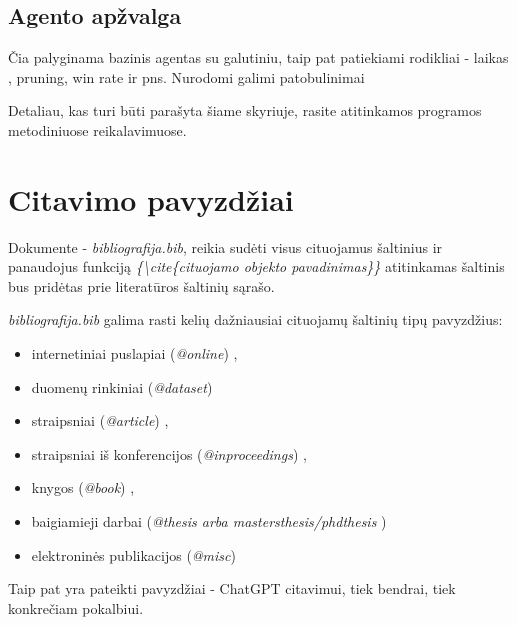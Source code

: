 \documentclass[]{VUMIFTemplateClass}
\begin{document}
\subsection{Agento apžvalga}
Čia palyginama bazinis agentas su galutiniu, taip pat patiekiami rodikliai - laikas , pruning, win rate ir pns. Nurodomi galimi patobulinimai




Detaliau, kas turi būti parašyta šiame skyriuje, rasite atitinkamos programos metodiniuose reikalavimuose. 

\printbibliography[title = {Literatūra ir šaltiniai}]


\appendix
\renewcommand{\thesection}{\arabic{section} priedas.}

\section{\phantom{Priedas} Citavimo pavyzdžiai}
Dokumente - \textit{bibliografija.bib}, reikia sudėti visus cituojamus šaltinius ir panaudojus funkciją \textit{\{\textbackslash cite\{cituojamo objekto pavadinimas\}\}} atitinkamas šaltinis bus pridėtas prie literatūros šaltinių sąrašo.


\textit{bibliografija.bib} galima rasti kelių dažniausiai cituojamų šaltinių tipų pavyzdžius:
\begin{itemize}
    \item internetiniai puslapiai (\textit{@online}) \cite{PvzInternetinisPuslapis},
    \item duomenų rinkiniai (\textit{@dataset}) \cite{dataset}
    \item straipsniai (\textit{@article}) \cite{PvzStraipsnLt, PvzStraipsnEn}, 
    \item straipsniai iš konferencijos (\textit{@inproceedings}) \cite{PvzKonfLt, PvzKonfEn}, 
    \item knygos (\textit{@book}) \cite{PvzKnygLt, PvzKnygEn}, 
    \item baigiamieji darbai (\textit{@thesis arba mastersthesis/phdthesis} \cite{PvzMagistrLt, PvzPhdEn})
    \item elektroninės publikacijos (\textit{@misc}) \cite{PvzElPubLt, PvzElPubEn}
\end{itemize}

Taip pat yra pateikti pavyzdžiai - ChatGPT citavimui, tiek bendrai\cite{chatgpt_bendrai}, tiek konkrečiam pokalbiui\cite{chatgpt_pokalbis}.
\end{document}

